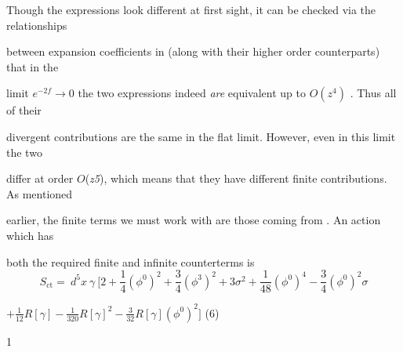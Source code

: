 \documentclass[a4paper,12pt]{article}
\begin{document}
Though the expressions look different at first sight, it can be checked via the relationships

between expansion coefficients in (along with their higher order counterparts) that in the

limit $e^{-2f} \rightarrow 0$ the two expressions indeed {\it are} equivalent up to $O(z^{4})$ . Thus all of their

divergent contributions are the same in the flat limit. However, even in this limit the two

differ at order $O$({\it z5}), which means that they have different finite contributions. As mentioned

earlier, the finite terms we must work with are those coming from . An action which has

both the required finite and infinite counterterms is
$$
 S_{\mathrm{c}\mathrm{t}}=\ d^{5}x\ \gamma\ [2+\frac{1}{4}(\phi^{0})^{2}+\frac{3}{4}(\phi^{3})^{2}+3\sigma^{2}+\frac{1}{48}(\phi^{0})^{4}-\frac{3}{4}(\phi^{0})^{2}\sigma
$$
\begin{center}
$+\displaystyle \frac{1}{12}R[\gamma]-\frac{1}{320}R[\gamma]^{2}-\frac{3}{32}R[\gamma](\phi^{0})^{2}]$   (6)
\end{center}
1
\end{document}
